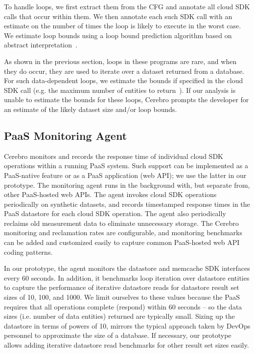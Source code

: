 To handle loops, we first extract them from the CFG and 
annotate all cloud SDK calls that occur within them.
We then annotate each such SDK call with an estimate on the number of times
the loop is likely to execute in the worst case. 
We estimate loop bounds using a loop bound prediction algorithm 
based on abstract interpretation~\cite{bygde2010static}. 

As shown in the previous section, loops in these programs 
are rare, and when they do occur, they are
used to iterate over a dataset returned from a database.
For such data-dependent loops, we estimate the bounds if specified 
in the cloud SDK call (e.g. the maximum number of 
entities to return~\cite{gae-fetch-options}).
If our analysis is unable to estimate the bounds for these loops, Cerebro prompts
the developer for an estimate of the likely dataset size and/or loop bounds.

\subsection{PaaS Monitoring Agent}
Cerebro monitors and records the response time of individual
cloud SDK operations within a running PaaS system.  Such support can be 
implemented as a PaaS-native feature or as
a PaaS application (web API); we use the latter in our prototype.
The monitoring agent runs in the background with, but separate from, 
other PaaS-hosted web APIs.
The agent invokes cloud SDK operations periodically on synthetic datasets, and 
records timestamped response times in the PaaS datastore for each cloud SDK
operation.
The agent also periodically reclaims old measurement data
to eliminate unnecessary storage. The Cerebro monitoring and reclamation 
rates are configurable, and monitoring benchmarks can be added and customized
easily to capture common PaaS-hosted web API coding patterns.

In our prototype, the agent monitors the datastore and memcache SDK interfaces
every 60 seconds. In addition, it 
benchmarks loop iteration over datastore entities to capture
the performance of iterative datastore reads for datastore result set sizes 
of 10, 100, and 1000. We limit ourselves to these values because the PaaS requires
that all operations complete (respond) within 60 seconds -- so the data
sizes (i.e. number of data entities) returned are typically small. Sizing up the datastore in terms of powers of 10,
mirrors the typical approach taken by DevOps personnel
to approximate the size of a database. If necessary, our prototype allows adding iterative
datastore read benchmarks for other result set sizes easily. 

